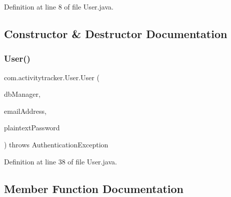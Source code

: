 Definition at line 8 of file User.\+java.



\subsection{Constructor \& Destructor Documentation}
\mbox{\label{classcom_1_1activitytracker_1_1_user_ae9f2a2555aa41e80ade28223907e01ab}} 
\subsubsection{\texorpdfstring{User()}{User()}}
{\footnotesize\ttfamily com.\+activitytracker.\+User.\+User (\begin{DoxyParamCaption}\item[{final \mbox{\hyperlink{classcom_1_1activitytracker_1_1_d_b_manager}{D\+B\+Manager}}}]{db\+Manager,  }\item[{final String}]{email\+Address,  }\item[{final String}]{plaintext\+Password }\end{DoxyParamCaption}) throws Authentication\+Exception\hspace{0.3cm}{\ttfamily [package]}}



Definition at line 38 of file User.\+java.



\subsection{Member Function Documentation}
\mbox{\label{classcom_1_1activitytracker_1_1_user_ab9d405e0fc6916bbf4836ce6ab762bea}} 
